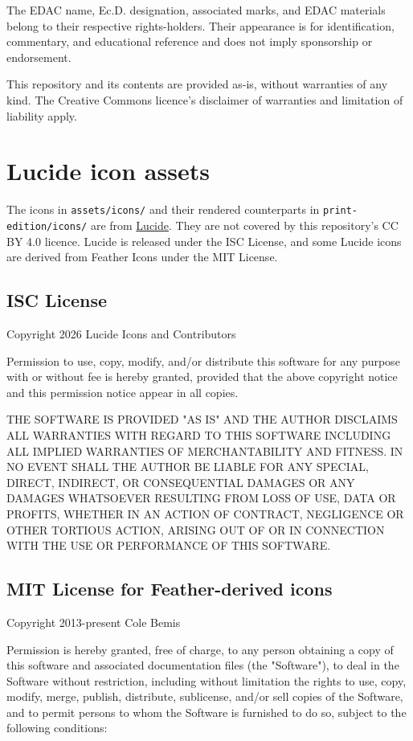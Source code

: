 \documentclass[11pt,letterpaper,oneside,openany]{book}
\begin{document}
The EDAC name, Ec.D. designation, associated marks, and EDAC materials belong to their respective rights-holders. Their appearance is for identification, commentary, and educational reference and does not imply sponsorship or endorsement.


This repository and its contents are provided as-is, without warranties of any kind. The Creative Commons licence's disclaimer of warranties and limitation of liability apply.


\section[Lucide icon assets]{Lucide icon assets}
The icons in \texttt{assets/icons/} and their rendered counterparts in \texttt{print-edition/icons/} are from \href{https://lucide.dev/}{Lucide}. They are not covered by this repository's CC BY 4.0 licence. Lucide is released under the ISC License, and some Lucide icons are derived from Feather Icons under the MIT License.


\subsection[ISC License]{ISC License}
Copyright \textcopyright{} 2026 Lucide Icons and Contributors


Permission to use, copy, modify, and/or distribute this software for any purpose with or without fee is hereby granted, provided that the above copyright notice and this permission notice appear in all copies.


THE SOFTWARE IS PROVIDED "AS IS" AND THE AUTHOR DISCLAIMS ALL WARRANTIES WITH REGARD TO THIS SOFTWARE INCLUDING ALL IMPLIED WARRANTIES OF MERCHANTABILITY AND FITNESS. IN NO EVENT SHALL THE AUTHOR BE LIABLE FOR ANY SPECIAL, DIRECT, INDIRECT, OR CONSEQUENTIAL DAMAGES OR ANY DAMAGES WHATSOEVER RESULTING FROM LOSS OF USE, DATA OR PROFITS, WHETHER IN AN ACTION OF CONTRACT, NEGLIGENCE OR OTHER TORTIOUS ACTION, ARISING OUT OF OR IN CONNECTION WITH THE USE OR PERFORMANCE OF THIS SOFTWARE.


\subsection[MIT License for Feather-derived icons]{MIT License for Feather-derived icons}
Copyright \textcopyright{} 2013-present Cole Bemis


Permission is hereby granted, free of charge, to any person obtaining a copy of this software and associated documentation files (the "Software"), to deal in the Software without restriction, including without limitation the rights to use, copy, modify, merge, publish, distribute, sublicense, and/or sell copies of the Software, and to permit persons to whom the Software is furnished to do so, subject to the following conditions:
\end{document}
